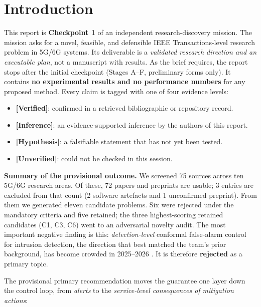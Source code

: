 \hypertarget{sec:intro}{%
\section{Introduction}\label{sec:intro}}

This report is \textbf{Checkpoint 1} of an independent
research-discovery mission. The mission asks for a novel, feasible, and
defensible IEEE Transactions-level research problem in 5G/6G systems.
Its deliverable is a \emph{validated research direction and an
executable plan}, not a manuscript with results. As the brief requires,
the report stops after the initial checkpoint (Stages A--F, preliminary
forms only). It contains \textbf{no experimental results and no
performance numbers} for any proposed method. Every claim is tagged with
one of four evidence levels:

\begin{itemize}
\tightlist
\item
  \textbf{{[}Verified{]}}: confirmed in a retrieved bibliographic or
  repository record.
\item
  \textbf{{[}Inference{]}}: an evidence-supported inference by the
  authors of this report.
\item
  \textbf{{[}Hypothesis{]}}: a falsifiable statement that has not yet
  been tested.
\item
  \textbf{{[}Unverified{]}}: could not be checked in this session.
\end{itemize}

\textbf{Summary of the provisional outcome.} We screened 75 sources
across ten 5G/6G research areas. Of these, 72 papers and preprints are
usable; 3 entries are excluded from that count (2 software artefacts and
1 unconfirmed preprint). From them we generated eleven candidate
problems. Six were rejected under the mandatory criteria and five
retained; the three highest-scoring retained candidates (C1, C3, C6)
went to an adversarial novelty audit. The most important negative
finding is this: \emph{detection-level} conformal false-alarm control
for intrusion detection, the direction that best matched the team's
prior background, has become crowded in 2025--2026
\citep{youssef2026caliburn, barrett2026firce, confid2026, robustcids2026, farzaneh2025ccoad}.
It is therefore \textbf{rejected} as a primary topic.

The provisional primary recommendation moves the guarantee one layer
down the control loop, from \emph{alerts} to the \emph{service-level
consequences of mitigation actions}:


